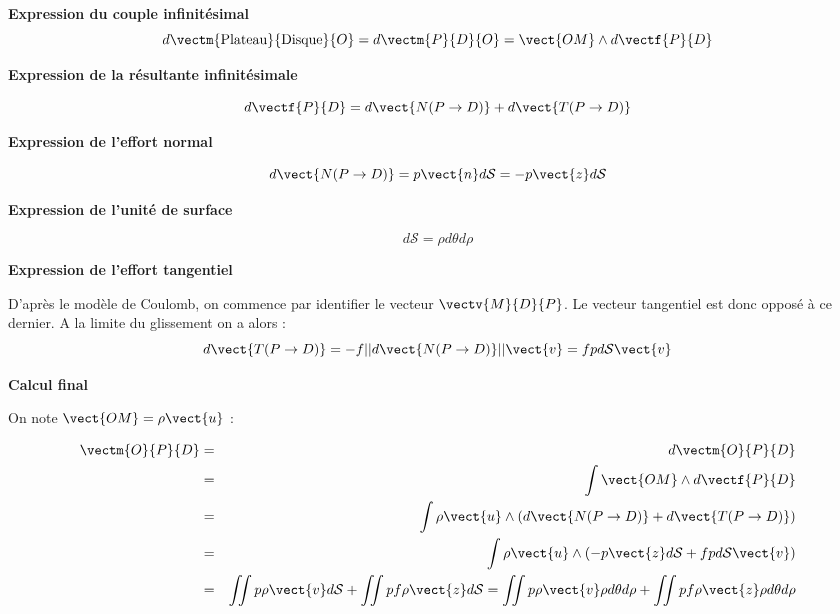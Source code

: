 



\ifprof

\begin{corrige}

\textbf{Expression du couple infinitésimal}
$$
d\vectm{\text{Plateau}}{\text{Disque}}{O} =
d\vectm{P}{D}{O} =  \vect{OM}\wedge d\vectf{P}{D}
$$

\textbf{Expression de la résultante infinitésimale}

$$
d\vectf{P}{D} = d\vect{N(P\rightarrow D)}+d\vect{T(P\rightarrow D)}
$$

\textbf{Expression de l'effort normal}

$$
d\vect{N(P\rightarrow D)} = p \vect{n} d\mathcal{S} = -p \vect{z} d\mathcal{S}
$$

\textbf{Expression de l'unité de surface}

$$
d\mathcal{S} = \rho d\theta d\rho
$$

\textbf{Expression de l'effort tangentiel}

D'après le modèle de Coulomb, on commence par identifier le vecteur $\vectv{M}{D}{P}$.
Le vecteur tangentiel est donc opposé à ce dernier. A la limite du glissement on a alors : 
$$
d\vect{T(P\rightarrow D)} = -f ||d\vect{N(P\rightarrow D)}|| \vect{v}    = fp d\mathcal{S}\vect{v}
$$

\textbf{Calcul final}

On note $\vect{OM}=\rho\vect{u}$ :

\begin{eqnarray*}
\vectm{O}{P}{D}  
&=& d\vectm{O}{P}{D}  \\
&=& \int \vect{OM}\wedge d\vectf{P}{D} \\
&=& \int \rho\vect{u} \wedge \left( d\vect{N(P\rightarrow D)}+d\vect{T(P\rightarrow D)} \right)\\
&=& \int \rho\vect{u} \wedge \left( -p \vect{z} d\mathcal{S} +fp d\mathcal{S}\vect{v} \right)\\
&=& \iint p\rho\vect{v} d\mathcal{S} +\iint pf\rho  \vect{z}d\mathcal{S} = 
\iint p\rho\vect{v} \rho d\theta d\rho +\iint pf\rho  \vect{z}\rho d\theta d\rho \\
\end{eqnarray*}


\end{corrige}
